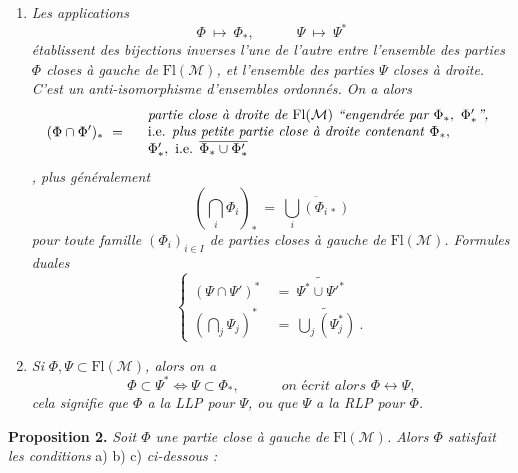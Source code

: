\documentclass[11pt]{article}
\newcommand{\printedpage}[1]{\marginpar{\footnotesize p.~#1}}
\newcommand{\msp}[1]{\marginpar{\footnotesize [#1]}}
\newcommand{\Fl}{\mathrm{Fl}}
\newcommand{\M}{\mathcal{M}}
\begin{document}
\begin{enumerate}[label={}]
\item[c)] \textit{Les applications}
\[
\Phi \ \longmapsto\ \Phi_*, \qquad\quad \Psi\ \longmapsto\ \Psi^*
\]
\textit{établissent des bijections inverses l'une de l'autre entre l'ensemble des parties $\Phi$ closes à gauche de} $\Fl(\M)$\textit{, et l'ensemble des parties $\Psi$ closes à droite. C'est un anti-isomorphisme d'ensembles ordonnés. On a alors}
\[
(\Phi \cap \Phi')_* \ = \quad
\begin{array}{l}
\textit{partie close à droite de } \Fl(\M) \ \textit{``engendrée par } \Phi_*,\ \Phi'_*\textit{'',} \\
\text{i.e. \textit{plus petite partie close à droite contenant} } \Phi_*, \\
\Phi'_*, \text{ i.e. } \overline{\Phi_* \cup \Phi'_*}
\end{array}
\]
\textit{, plus généralement}
\[
(\bigcap_i \Phi_i)_* \ = \ \overline{\bigcup_i (\Phi_{i\,*})}
\]
\textit{pour toute famille $(\Phi_i)_{i \in I}$ de parties closes à gauche de} $\Fl(\M)$\textit{. Formules duales} 
\[
\left\{
\begin{aligned}
(\Psi \cap \Psi')^* \ &= \ \widetilde{\Psi^* \cup \Psi'^*} \\
(\bigcap_j \Psi_j)^* \ &= \ \widetilde{\bigcup_j (\Psi_j^*)}\ .
\end{aligned}
\right.
\]

\item[d)] \textit{Si} $\Phi, \Psi \subset \Fl(\M)$\textit{, alors on a}
\[
\Phi \subset \Psi^* \iff \Psi \subset \Phi_*, \qquad\quad \textit{on écrit alors } \Phi \longleftrightarrow \Psi,
\]
\textit{cela signifie que $\Phi$ a la LLP pour $\Psi$, ou que $\Psi$ a la RLP pour $\Phi$.}
\end{enumerate}

\printedpage{3}

\msp{page 4}

\noindent\textbf{Proposition 2.} \textit{Soit $\Phi$ une partie close à gauche de} $\Fl(\M)$\textit{. Alors $\Phi$ satisfait les conditions} a) b) c) \textit{ci-dessous :}
\end{document}
